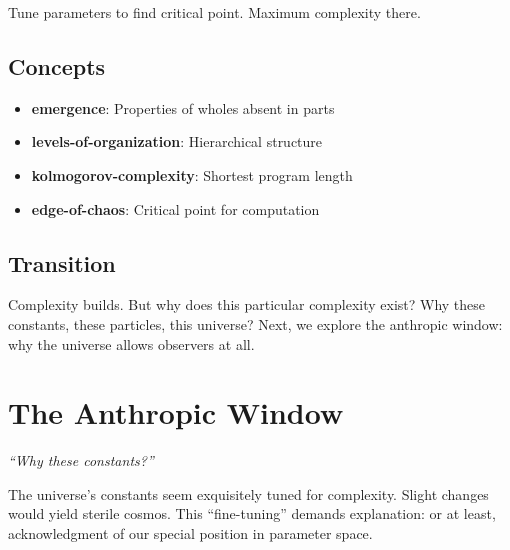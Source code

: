 \documentclass[
  11pt,
  letterpaper,
  twoside,
  openright]{book}
\providecommand{\tightlist}{%
  \setlength{\itemsep}{0pt}\setlength{\parskip}{0pt}}
\begin{document}
Tune parameters to find critical point. Maximum complexity there.

\section{Concepts}\label{concepts-40}

\begin{itemize}
\tightlist
\item
  \textbf{emergence}: Properties of wholes absent in parts
\item
  \textbf{levels-of-organization}: Hierarchical structure
\item
  \textbf{kolmogorov-complexity}: Shortest program length
\item
  \textbf{edge-of-chaos}: Critical point for computation
\end{itemize}

\section{Transition}\label{transition-41}

Complexity builds. But why does this particular complexity exist? Why
these constants, these particles, this universe? Next, we explore the
anthropic window: why the universe allows observers at all.

\chapter{The Anthropic Window}\label{sec-anthropic-window}

\emph{``Why these constants?''}

\begin{tcolorbox}[enhanced jigsaw, coltitle=black, colbacktitle=quarto-callout-note-color!10!white, toprule=.15mm, colframe=quarto-callout-note-color-frame, arc=.35mm, opacityback=0, bottomtitle=1mm, toptitle=1mm, breakable, colback=white, titlerule=0mm, opacitybacktitle=0.6, title=\textcolor{quarto-callout-note-color}{\faInfo}\hspace{0.5em}{Key Revelation}, rightrule=.15mm, bottomrule=.15mm, leftrule=.75mm, left=2mm]

The universe's constants seem exquisitely tuned for complexity. Slight
changes would yield sterile cosmos. This ``fine-tuning'' demands
explanation: or at least, acknowledgment of our special position in
parameter space.

\end{tcolorbox}
\end{document}
